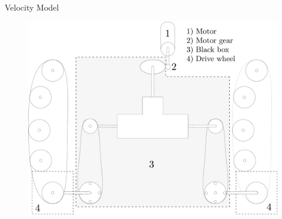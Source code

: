 \begin{frame}{Velocity Model}{}
  
    \begin{figure}[H]
	\centering
	\includegraphics[scale=0.15]{Pictures/vehicleDescriptionDriveTrainBlackBox2.pdf}
    
\end{figure}

\end{frame}


